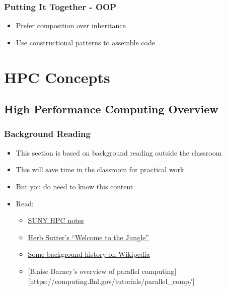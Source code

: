 \subsubsection{Putting It Together -
OOP}\label{putting-it-together---oop}

\begin{itemize}
\itemsep1pt\parskip0pt
\item
  Prefer composition over inheritance
\item
  Use constructional patterns to assemble code
\end{itemize}

\section{HPC Concepts}\label{hpc-concepts}

\subsection{High Performance Computing
Overview}\label{high-performance-computing-overview}

\subsubsection{Background Reading}\label{background-reading}

\begin{itemize}
\item
  This section is based on background reading outside the classroom
\item
  This will save time in the classroom for practical work
\item
  But you do need to know this content
\item
  Read:

  \begin{itemize}
  \itemsep1pt\parskip0pt
  \item
    \href{https://www.buffalo.edu/content/www/ccr/support/training-resources/tutorials/advanced-topics-{}-e-g-{}-mpi-{}-gpgpu-{}-openmp-{}-etc-{}-/2011-09-{}-{}-parallel-programming-overview-{}-hpc-1-/_jcr_content/par/download/file.res/briefpp-handout-2x2.pdf}{SUNY
    HPC notes}
  \item
    \href{http://herbsutter.com/welcome-to-the-jungle}{Herb Sutter's
    ``Welcome to the Jungle''}
  \item
    \href{http://en.wikipedia.org/wiki/Supercomputer}{Some background
    history on Wikipedia}
  \item
    {[}Blaise Barney's overview of parallel
    computing{]}{[}https://computing.llnl.gov/tutorials/parallel\_comp/{]}
  \end{itemize}
\end{itemize}

